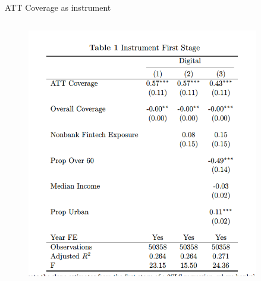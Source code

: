 \documentclass[notes,10pt, aspectratio=169]{beamer}
\begin{document}
    
\begin{frame}{ATT Coverage as instrument}



\begin{columns}[T]
    
    \begin{column}{0.5\textwidth}
    
    \begin{figure}
        \centering
        \includegraphics[width=0.95\textwidth]{imgs/tab1.png}
    \end{figure}

\end{column}
\begin{column}{0.5\textwidth}
    


\end{column}
\end{columns}
\end{frame}
\end{document}
